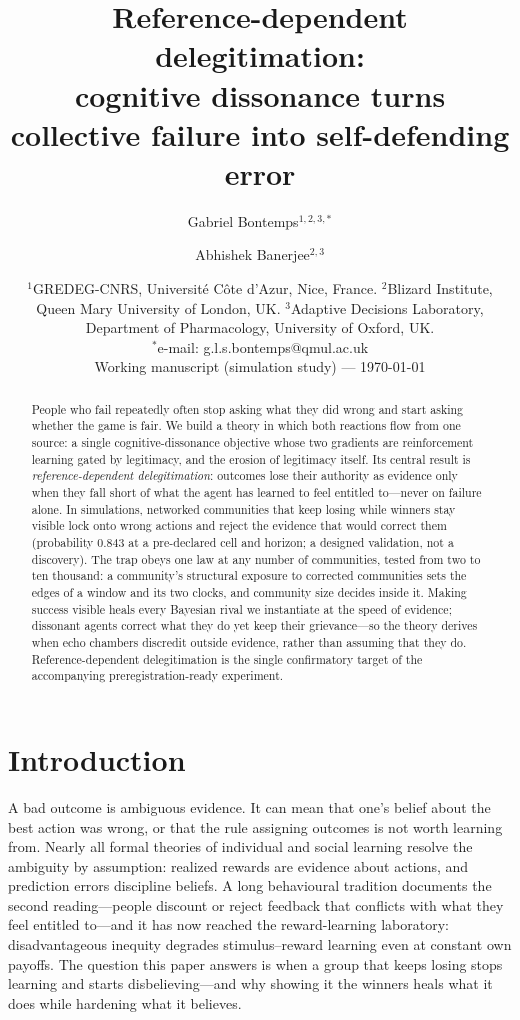 \documentclass[11pt]{article}
\title{\bfseries Reference-dependent delegitimation:\\ cognitive dissonance turns collective failure into self-defending error}
\author{Gabriel Bontemps$^{1,2,3,\ast}$ \and Abhishek Banerjee$^{2,3}$}
\date{\small $^1$GREDEG-CNRS, Universit\'e C\^ote d'Azur, Nice, France. $^2$Blizard Institute, Queen Mary University of London, UK. $^3$Adaptive Decisions Laboratory, Department of Pharmacology, University of Oxford, UK.\\ $^\ast$e-mail: g.l.s.bontemps@qmul.ac.uk\\[2mm] Working manuscript (simulation study) --- \today}
\newcommand{\1}{\mathbf{1}}
\begin{document}
\maketitle

\begin{abstract}
\noindent People who fail repeatedly often stop asking what they did wrong and start asking whether the game is fair. We build a theory in which both reactions flow from one source: a single cognitive-dissonance objective whose two gradients are reinforcement learning gated by legitimacy, and the erosion of legitimacy itself. Its central result is \emph{reference-dependent delegitimation}: outcomes lose their authority as evidence only when they fall short of what the agent has learned to feel entitled to---never on failure alone. In simulations, networked communities that keep losing while winners stay visible lock onto wrong actions and reject the evidence that would correct them (probability $0.843$ at a pre-declared cell and horizon; a designed validation, not a discovery). The trap obeys one law at any number of communities, tested from two to ten thousand: a community's structural exposure to corrected communities sets the edges of a window and its two clocks, and community size decides inside it. Making success visible heals every Bayesian rival we instantiate at the speed of evidence; dissonant agents correct what they do yet keep their grievance---so the theory derives when echo chambers discredit outside evidence, rather than assuming that they do. Reference-dependent delegitimation is the single confirmatory target of the accompanying preregistration-ready experiment.
\end{abstract}

\vspace{2mm}

\section{Introduction}

A bad outcome is ambiguous evidence. It can mean that one's belief about the best action was wrong, or that the rule assigning outcomes is not worth learning from. Nearly all formal theories of individual and social learning resolve the ambiguity by assumption: realized rewards are evidence about actions, and prediction errors discipline beliefs\cite{SuttonBarto2018,DeGroot1974,GolubJackson2010}. A long behavioural tradition documents the second reading---people discount or reject feedback that conflicts with what they feel entitled to\cite{Festinger1957,Kunda1990,Tyler2006}---and it has now reached the reward-learning laboratory: disadvantageous inequity degrades stimulus--reward learning even at constant own payoffs\cite{HamJenkins2025}. The question this paper answers is when a group that keeps losing stops learning and starts disbelieving---and why showing it the winners heals what it does while hardening what it believes.
\end{document}

